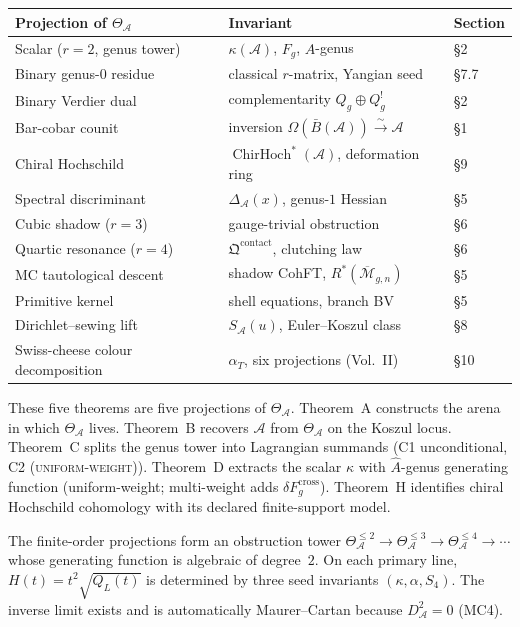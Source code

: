 \documentclass[11pt]{report}
\theoremstyle{definition}
\theoremstyle{remark}
\providecommand{\cA}{\mathcal{A}}
\providecommand{\cM}{\mathcal{M}}
\providecommand{\barB}{\bar{B}}
\numberwithin{equation}{section}
\begin{document}
\medskip
\begin{center}
\small
\renewcommand{\arraystretch}{1.15}
\begin{tabular}{lll}
\textbf{Projection of $\Theta_\cA$} & \textbf{Invariant} & \textbf{Section}\\
\hline
Scalar ($r=2$, genus tower) & $\kappa(\cA)$, $F_g$, $\hat A$-genus & \S2\\[1pt]
Binary genus-$0$ residue & classical $r$-matrix, Yangian seed & \S7.7\\[1pt]
Binary Verdier dual & complementarity $Q_g\oplus Q_g^!$ & \S2\\[1pt]
Bar-cobar counit & inversion $\Omega(\barB(\cA))\xrightarrow{\sim}\cA$ & \S1\\[1pt]
Chiral Hochschild & $\operatorname{ChirHoch}^*(\cA)$, deformation ring & \S9\\[1pt]
Spectral discriminant & $\Delta_\cA(x)$, genus-$1$ Hessian & \S5\\[1pt]
Cubic shadow ($r=3$) & gauge-trivial obstruction & \S6\\[1pt]
Quartic resonance ($r=4$) & $\mathfrak Q^{\mathrm{contact}}$, clutching law & \S6\\[1pt]
MC tautological descent & shadow CohFT, $R^*(\overline{\cM}_{g,n})$ & \S5\\[1pt]
Primitive kernel & shell equations, branch BV & \S5\\[1pt]
Dirichlet--sewing lift & $S_\cA(u)$, Euler--Koszul class & \S8\\[1pt]
Swiss-cheese colour decomposition & $\alpha_T$, six projections (Vol.~II) & \S10
\end{tabular}
\end{center}
\medskip

\noindent
These five theorems are five projections of $\Theta_\cA$. Theorem~A
constructs the arena in which $\Theta_\cA$ lives. Theorem~B
recovers $\cA$ from $\Theta_\cA$ on the Koszul locus. Theorem~C
splits the genus tower into Lagrangian summands (C1 unconditional, C2
\textsc{(uniform-weight)}). Theorem~D extracts the scalar $\kappa$
with $\hat A$-genus generating function (uniform-weight; multi-weight
adds $\delta F_g^{\mathrm{cross}}$). Theorem~H identifies chiral
Hochschild cohomology with its declared finite-support model.

The finite-order projections form an obstruction tower
$\Theta_\cA^{\le 2}\to\Theta_\cA^{\le 3}\to\Theta_\cA^{\le 4}\to\cdots$
whose generating function is algebraic of degree~$2$. On each
primary line,
$H(t)=t^2\sqrt{Q_L(t)}$ is determined by three seed invariants
$(\kappa,\alpha,S_4)$. The inverse limit exists and is automatically
Maurer--Cartan because $D_\cA^2=0$ (MC4).
\end{document}
